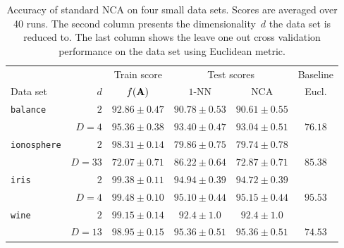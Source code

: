 \begin{table}
  \centering\begin{tabular}{lrcccc}
  \toprule
	  &     & Train score  & \multicolumn{2}{c}{Test scores} & Baseline \\
  \cmidrule(r){3-3} \cmidrule(r){4-5} \cmidrule(r){6-6}
  Data set & $d$ & $f(\mathbf{A})$ & $1$-NN & NCA & Eucl. \\
  \midrule
    \texttt{balance}&$2$&$92.86 \pm 0.47$&$90.78 \pm 0.53$&$90.61 \pm 0.55$&\\ 
		    &$D=4$&$95.36 \pm 0.38$&$93.40 \pm 0.47$&$93.04 \pm 0.51$&$76.18$\\ 
    \midrule
    \texttt{ionosphere}&$2$&$98.31 \pm 0.14$&$79.86 \pm 0.75$&$79.74 \pm 0.78$&\\ 
		       &$D=33$&$72.07 \pm 0.71$&$86.22 \pm 0.64$&$72.87 \pm 0.71$&$85.38$\\ 
    \midrule
    \texttt{iris}&$2$&$99.38 \pm 0.11$&$94.94 \pm 0.39$&$94.72 \pm 0.39$&\\ 
		 &$D=4$&$99.48 \pm 0.10$&$95.10 \pm 0.44$&$95.15 \pm 0.44$&$95.53$\\
    \midrule
    \texttt{wine}&$2$&$99.15 \pm 0.14$&$92.4 \pm 1.0$&$92.4 \pm 1.0$&\\ 
		 &$D=13$&$98.95 \pm 0.15$&$95.36 \pm 0.51$&$95.36 \pm 0.51$&$74.53$\\ 
  \bottomrule
  \end{tabular}
  \caption{\small Accuracy of standard NCA on four small data sets. Scores are averaged over 40 runs. The second column presents the dimensionality~$d$ the data set is reduced to. The last column shows the leave one out cross validation performance on the data set using Euclidean metric.}
  \label{table:eval-baseline}
\end{table}

% 

